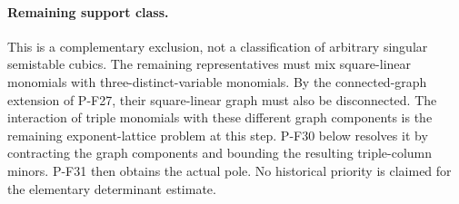 \paragraph{Remaining support class.}
This is a complementary exclusion, not a classification
of arbitrary singular semistable cubics. The remaining
representatives must mix square-linear monomials with
three-distinct-variable monomials. By the connected-graph
extension of P-F27, their square-linear graph must also
be disconnected. The interaction of triple monomials
with these different graph components is the remaining
exponent-lattice problem at this step. P-F30 below resolves it
by contracting the graph components and bounding the resulting
triple-column minors. P-F31 then obtains the actual pole.
No historical priority is
claimed for the elementary determinant estimate.

